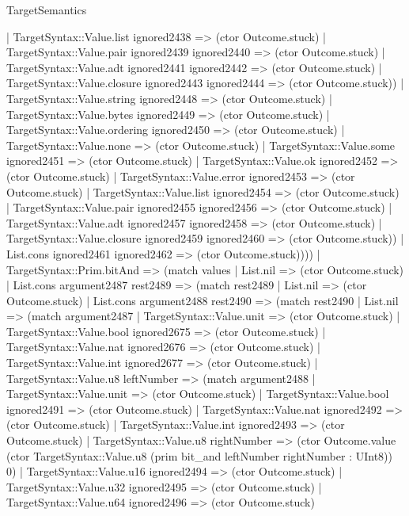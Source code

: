 \begin{lexlean}{TargetSemantics}
\begin{semanticmodule}
{              | TargetSyntax::Value.list ignored2438 => (ctor Outcome.stuck)
              | TargetSyntax::Value.pair ignored2439 ignored2440 => (ctor Outcome.stuck)
              | TargetSyntax::Value.adt ignored2441 ignored2442 => (ctor Outcome.stuck)
              | TargetSyntax::Value.closure ignored2443 ignored2444 => (ctor Outcome.stuck))
            | TargetSyntax::Value.string ignored2448 => (ctor Outcome.stuck)
            | TargetSyntax::Value.bytes ignored2449 => (ctor Outcome.stuck)
            | TargetSyntax::Value.ordering ignored2450 => (ctor Outcome.stuck)
            | TargetSyntax::Value.none => (ctor Outcome.stuck)
            | TargetSyntax::Value.some ignored2451 => (ctor Outcome.stuck)
            | TargetSyntax::Value.ok ignored2452 => (ctor Outcome.stuck)
            | TargetSyntax::Value.error ignored2453 => (ctor Outcome.stuck)
            | TargetSyntax::Value.list ignored2454 => (ctor Outcome.stuck)
            | TargetSyntax::Value.pair ignored2455 ignored2456 => (ctor Outcome.stuck)
            | TargetSyntax::Value.adt ignored2457 ignored2458 => (ctor Outcome.stuck)
            | TargetSyntax::Value.closure ignored2459 ignored2460 => (ctor Outcome.stuck))
          | List.cons ignored2461 ignored2462 => (ctor Outcome.stuck))))
    | TargetSyntax::Prim.bitAnd => (match values
      | List.nil => (ctor Outcome.stuck)
      | List.cons argument2487 rest2489 => (match rest2489
        | List.nil => (ctor Outcome.stuck)
        | List.cons argument2488 rest2490 => (match rest2490
          | List.nil => (match argument2487
            | TargetSyntax::Value.unit => (ctor Outcome.stuck)
            | TargetSyntax::Value.bool ignored2675 => (ctor Outcome.stuck)
            | TargetSyntax::Value.nat ignored2676 => (ctor Outcome.stuck)
            | TargetSyntax::Value.int ignored2677 => (ctor Outcome.stuck)
            | TargetSyntax::Value.u8 leftNumber => (match argument2488
              | TargetSyntax::Value.unit => (ctor Outcome.stuck)
              | TargetSyntax::Value.bool ignored2491 => (ctor Outcome.stuck)
              | TargetSyntax::Value.nat ignored2492 => (ctor Outcome.stuck)
              | TargetSyntax::Value.int ignored2493 => (ctor Outcome.stuck)
              | TargetSyntax::Value.u8 rightNumber => (ctor Outcome.value (ctor TargetSyntax::Value.u8 (prim bit_and leftNumber rightNumber : UInt8)) 0)
              | TargetSyntax::Value.u16 ignored2494 => (ctor Outcome.stuck)
              | TargetSyntax::Value.u32 ignored2495 => (ctor Outcome.stuck)
              | TargetSyntax::Value.u64 ignored2496 => (ctor Outcome.stuck)
}
\end{semanticmodule}
\end{lexlean}
